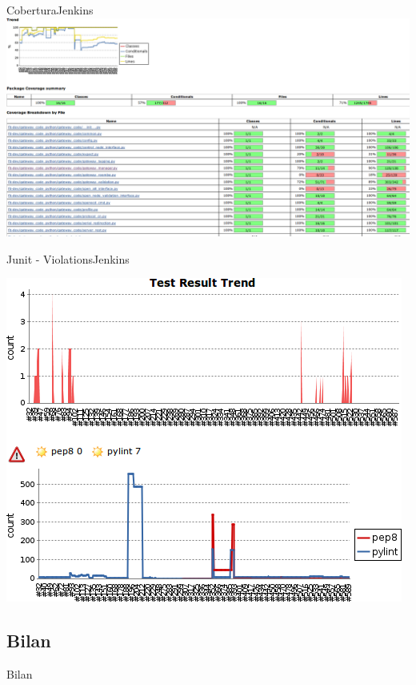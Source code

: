\documentclass[9pt]{beamer}
\begin{document}
\begin{frame}{Cobertura}{Jenkins}
        \includegraphics[width=\linewidth]{images/cobertura}\\
\end{frame}
\begin{frame}{Junit - Violations}{Jenkins}
\begin{center}
        \includegraphics[height=0.8\textheight]{images/junit_violations}\\
\end{center}
\end{frame}



\subsection{Bilan}
\frame{\tableofcontents[currentsubsection,sectionstyle=show/shaded,subsubsectionstyle=show/shaded]}
\begin{frame}{Bilan}
\end{frame}
\end{document}
